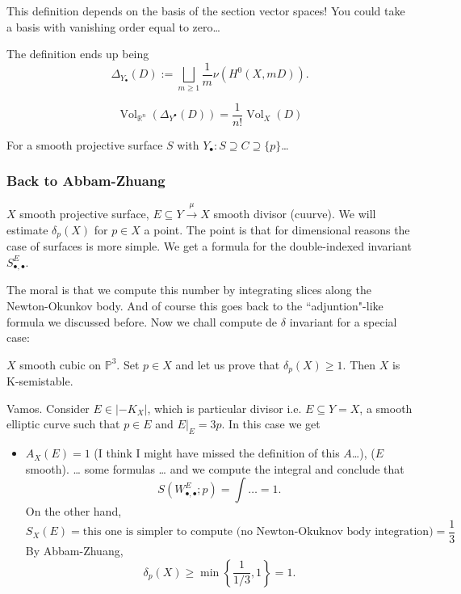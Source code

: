 \begin{remark}[Zikas]\leavevmode
This definition depends on the basis of the section vector spaces! You could take a basis with vanishing order equal to zero…
\end{remark}

The definition ends up being
\[\Delta_{Y_{\bullet}}(D):=\bigsqcup_{m \geq 1}\frac{1}{m}\nu(H^{0}(X,mD)).\]

\begin{thm}\leavevmode
\[\operatorname{Vol}_{\mathbb{R}^n}(\Delta_{Y^\bullet}(D))=\frac{1}{n!}\operatorname{Vol}_X(D)\]
\end{thm}

\begin{example}\leavevmode
For a smooth projective surface \(S\) with \(Y_\bullet:S \supseteq C \supseteq \{ p\}\)…
\end{example}

\subsubsection{Back to Abbam-Zhuang}

\(X\) smooth projective surface, \(E \subseteq Y \xrightarrow{\mu}X\) smooth divisor (cuurve). We will estimate \(\delta_p(X)\) for \(p \in X\) a point. The point is that for dimensional reasons the case of surfaces is more simple. We get a formula for the double-indexed invariant \(S_{\bullet,\bullet}^E\).

The moral is that we compute this number by integrating slices along the Newton-Okunkov body. And of course this goes back to the ``adjuntion"-like formula we discussed before. Now we chall compute de \(\delta\) invariant for a special case:

\begin{example}\leavevmode
\(X\) smooth cubic on \(\mathbb{P}^3\). Set \(p \in X\) and let us prove that  \(\delta_p(X) \geq  1\). Then \(X\) is K-semistable.

Vamos. Consider \(E \in |-K_X|\), which is  particular divisor i.e. \(E \subseteq Y =X\), a smooth elliptic curve such that \(p \in E \) and \(E |_{E}=3p\). In this case we get
\begin{itemize}
\item \(A_X(E)=1\) (I think I might have missed the definition of this \(A\)…), (\(E\) smooth). … some formulas … and we compute the integral and conclude that
	\[S(W_{\bullet,\bullet}^E;p)= \int \ldots =1.\]
	On the other hand,
	\[S_X(E)=\text{this one is simpler to compute (no Newton-Okuknov body integration)} =\frac{1}{3}\]
By Abbam-Zhuang,
\[\delta_p(X) \geq \operatorname{min}\left\{ \frac{1}{1/3},1 \right\} =1.\]

	
\end{itemize}
\end{example}






